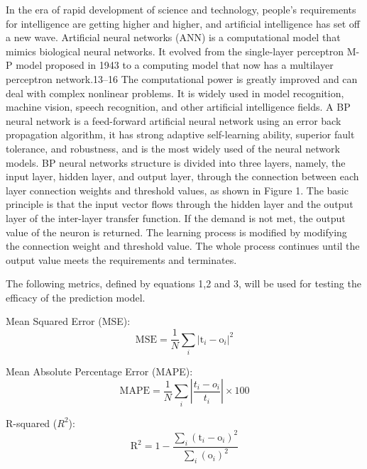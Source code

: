 \documentclass[suppldata]{interact}
\begin{document}
  In the era of rapid development of science and technology, people’s requirements for intelligence are getting higher
and higher, and artificial intelligence has set off a new wave. Artificial neural networks (ANN) is a computational model
that mimics biological neural networks. It evolved from the single-layer perceptron M-P model proposed in 1943 to a
computing model that now has a multilayer perceptron network.13–16 The computational power is greatly improved and
can deal with complex nonlinear problems. It is widely used in model recognition, machine vision, speech recognition,
and other artificial intelligence fields. A BP neural network is a feed-forward artificial neural network using an error back
propagation algorithm, it has strong adaptive self-learning ability, superior fault tolerance, and robustness, and is the
most widely used of the neural network models. BP neural networks structure is divided into three layers, namely, the
input layer, hidden layer, and output layer, through the connection between each layer connection weights and threshold
values, as shown in Figure 1. The basic principle is that the input vector flows through the hidden layer and the output
layer of the inter-layer transfer function. If the demand is not met, the output value of the neuron is returned. The learning
process is modified by modifying the connection weight and threshold value. The whole process continues until the output
value meets the requirements and terminates.\cite{zhang2023prediction}

The following metrics, defined by equations 1,2 and 3, will be used for testing the efficacy of the prediction model. 

Mean Squared Error (MSE):
\begin{equation}
\mathrm{MSE} = \frac{1}{N} \sum_{i}\left|\mathrm{t}_{i}-\mathrm{o}_{i}\right|^{2}
\end{equation}

Mean Absolute Percentage Error (MAPE):
\begin{equation}
\mathrm{MAPE} = \frac{1}{N} \sum_{i}\left|\frac{t_{i}-o_{i}}{t_{i}}\right| \times 100
\end{equation}

R-squared (\( R^2 \)):
\begin{equation}
\mathrm{R^{2}} = 1 - \frac{\sum_{i}(\mathrm{t}_{i}-\mathrm{o}_{i})^{2}}{\sum_{i}(\mathrm{o}_{i})^{2}}
\end{equation}
\newpage 
\end{document}

